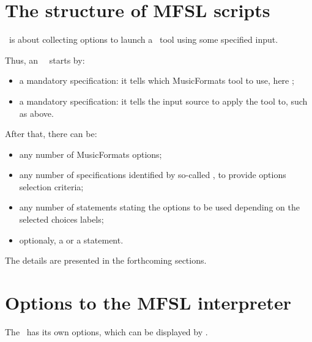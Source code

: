 \section{The structure of MFSL scripts}

\mfslLang\ is about collecting options to launch a \mf\ tool using some specified input.

Thus, an \mfslLang\ \script\ starts by:
\begin{itemize}
\item a mandatory  specification: it tells which MusicFormats tool
    to use, here \xmlToLy;

\item  a mandatory   specification: it tells the input source to apply
    the tool to, such as  above.
\end{itemize}

After that, there can be:
\begin{itemize}
\item  any number of MusicFormats options;

\item  any number of   specifications identified by so-called , to provide options selection criteria;

\item any number of   statements stating the options to be used depending on
  the selected choices labels;

\item optionaly, a  or a  statement.

\end{itemize}

The details are presented in the forthcoming sections.


\section{Options to the MFSL interpreter}

The \mfslLangInterp\ has its own options, which can be displayed by .

